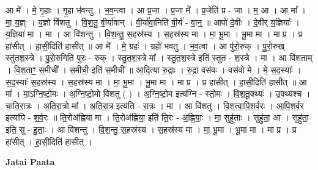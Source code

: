 \documentclass[17pt]{extarticle}
\begin{document}
आ मे᳚ । मे॒ गृ॒हाः । गृ॒हा भ॑वन्तु । भ॒व॒न्त्वा । आ प्र॒जा । प्र॒जा मे᳚ । प्र॒जेति॑ प्र - जा । म॒ आ । आ मा᳚ । मा॒ य॒ज्ञ्ः । य॒ज्ञो वि॑शतु । वि॒श॒तु॒ वी॒र्या॑वान् । वी॒र्या॑वा॒निति॑ वी॒र्य॑ - वा॒न्॒ ॥ आपो॑ दे॒वीः । दे॒वीर् य॒ज्ञियाः᳚ । य॒ज्ञिया॑ मा । 
मा । आ वि॑शन्तु । वि॒श॒न्तु॒ स॒हस्र॑स्य । स॒हस्र॑स्य मा । मा॒ भू॒मा । भू॒मा मा । मा प्र । प्र हा॑सीत् । हा॒सी॒दिति॑ हासीत् ॥ आ मे᳚ । मे॒ ग्रहः॑ । ग्रहो॑ भवतु । भ॒व॒त्वा । आ पु॑रो॒रुक् । पु॒रो॒रुख् स्तु॑तश॒स्त्रे । पु॒रो॒रुगिति॑ पुरः - रुक् । स्तु॒त॒श॒स्त्रे मा᳚ । स्तु॒त॒श॒स्त्रे इति॑ स्तुत - श॒स्त्रे । मा । आ वि॑शताम् । वि॒श॒ताꣳ॒॒ स॒मीची᳚ । स॒मीची॒ इति॑ स॒मीची᳚ ॥ आ॒दि॒त्या रु॒द्राः । रु॒द्रा वस॑वः । वस॑वो मे । मे॒ स॒द॒स्याः᳚ । स॒द॒स्याः᳚ स॒हस्र॑स्य । स॒हस्र॑स्य मा । मा॒ भू॒मा । भू॒मा मा । मा प्र । प्र हा॑सीत् । हा॒सी॒दिति॑ हासीत् ॥ आ मा᳚ । मा॒ऽग्नि॒ष्टो॒मः । अ॒ग्नि॒ष्टो॒मो वि॑शतु ( ) । अ॒ग्नि॒ष्टो॒म इत्य॑ग्नि - स्तो॒मः । वि॒श॒तू॒क्थ्यः॑ । उ॒क्थ्य॑श्च । चा॒ति॒रा॒त्रः । अ॒ति॒रा॒त्रो मा᳚ । अ॒ति॒रा॒त्र इत्य॑ति - रा॒त्रः । मा । आ वि॑शतु । वि॒श॒त्वा॒पि॒श॒र्व॒रः । आ॒पि॒श॒र्व॒र इत्या॑पि - श॒र्व॒रः ॥ ति॒रोअ॑ह्निया मा । ति॒रोअ॑ह्निया॒ इति॑ ति॒रः - अ॒ह्नि॒याः॒ । मा॒ सुहु॑ताः । सुहु॑ता॒ आ । सुहु॑ता॒ इति॒ सु - हु॒ताः॒ । आ वि॑शन्तु । वि॒श॒न्तु॒ स॒हस्र॑स्य । स॒हस्र॑स्य मा । मा॒ भू॒मा । भू॒मा मा । मा प्र । प्र हा॑सीत् । हा॒सी॒दिति॑ हासीत् । \newline

\textbf{Jatai Paata} \newline
\end{document}
